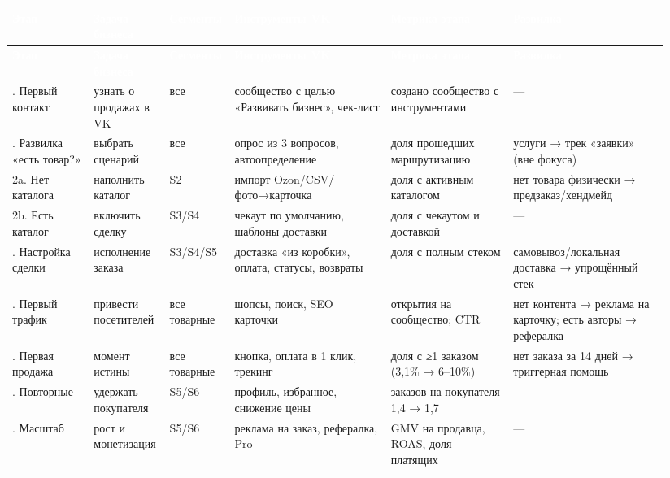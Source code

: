 \documentclass[10pt,a4paper]{article}
\begin{document}
\begin{longtable}{@{}>{\raggedright\arraybackslash}p{0.1255\linewidth}>{\raggedright\arraybackslash}p{0.1104\linewidth}>{\raggedright\arraybackslash}p{0.0602\linewidth}>{\raggedright\arraybackslash}p{0.2308\linewidth}>{\raggedright\arraybackslash}p{0.1807\linewidth}>{\raggedright\arraybackslash}p{0.2308\linewidth}@{}}
\rowcolor{blue}
\textcolor{white}{\textbf{Этап}} & \textcolor{white}{\textbf{Задача бизнеса}} & \textcolor{white}{\textbf{Сегменты}} & \textcolor{white}{\textbf{Инструменты VK}} & \textcolor{white}{\textbf{Метрика этапа}} & \textcolor{white}{\textbf{Развилка}} \\
\endfirsthead
\rowcolor{blue}
\textcolor{white}{\textbf{Этап}} & \textcolor{white}{\textbf{Задача бизнеса}} & \textcolor{white}{\textbf{Сегменты}} & \textcolor{white}{\textbf{Инструменты VK}} & \textcolor{white}{\textbf{Метрика этапа}} & \textcolor{white}{\textbf{Развилка}} \\
\endhead
\hline
0. Первый контакт & узнать о продажах в VK & все & сообщество с целью «Развивать бизнес», чек-лист & создано сообщество с инструментами & — \\
1. Развилка «есть товар?» & выбрать сценарий & все & опрос из 3 вопросов, автоопределение & доля прошедших маршрутизацию & услуги → трек «заявки» (вне фокуса) \\
2a. Нет каталога & наполнить каталог & S2 & импорт Ozon/CSV/фото→карточка & доля с активным каталогом & нет товара физически → предзаказ/хендмейд \\
2b. Есть каталог & включить сделку & S3/S4 & чекаут по умолчанию, шаблоны доставки & доля с чекаутом и доставкой & — \\
3. Настройка сделки & исполнение заказа & S3/S4/S5 & доставка «из коробки», оплата, статусы, возвраты & доля с полным стеком & самовывоз/локальная доставка → упрощённый стек \\
4. Первый трафик & привести посетителей & все товарные & шопсы, поиск, SEO карточки & открытия на сообщество; CTR & нет контента → реклама на карточку; есть авторы → рефералка \\
5. Первая продажа & момент истины & все товарные & кнопка, оплата в 1 клик, трекинг & доля с ≥1 заказом (3,1\% → 6–10\%) & нет заказа за 14 дней → триггерная помощь \\
6. Повторные & удержать покупателя & S5/S6 & профиль, избранное, снижение цены & заказов на покупателя 1,4 → 1,7 & — \\
7. Масштаб & рост и монетизация & S5/S6 & реклама на заказ, рефералка, Pro & GMV на продавца, ROAS, доля платящих & — \\
\hline
\end{longtable}
\endgroup
\vspace{4pt}
\end{document}
